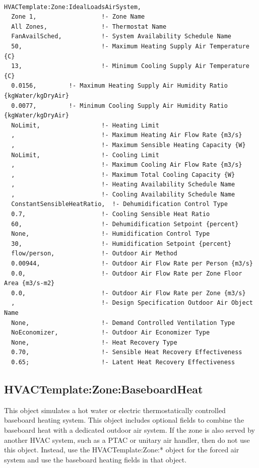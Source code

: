 \begin{lstlisting}

HVACTemplate:Zone:IdealLoadsAirSystem,
  Zone 1,                  !- Zone Name
  All Zones,               !- Thermostat Name
  FanAvailSched,           !- System Availability Schedule Name
  50,                      !- Maximum Heating Supply Air Temperature {C}
  13,                      !- Minimum Cooling Supply Air Temperature {C}
  0.0156,         !- Maximum Heating Supply Air Humidity Ratio {kgWater/kgDryAir}
  0.0077,         !- Minimum Cooling Supply Air Humidity Ratio {kgWater/kgDryAir}
  NoLimit,                 !- Heating Limit
  ,                        !- Maximum Heating Air Flow Rate {m3/s}
  ,                        !- Maximum Sensible Heating Capacity {W}
  NoLimit,                 !- Cooling Limit
  ,                        !- Maximum Cooling Air Flow Rate {m3/s}
  ,                        !- Maximum Total Cooling Capacity {W}
  ,                        !- Heating Availability Schedule Name
  ,                        !- Cooling Availability Schedule Name
  ConstantSensibleHeatRatio,  !- Dehumidification Control Type
  0.7,                     !- Cooling Sensible Heat Ratio
  60,                      !- Dehumidification Setpoint {percent}
  None,                    !- Humidification Control Type
  30,                      !- Humidification Setpoint {percent}
  flow/person,             !- Outdoor Air Method
  0.00944,                 !- Outdoor Air Flow Rate per Person {m3/s}
  0.0,                     !- Outdoor Air Flow Rate per Zone Floor Area {m3/s-m2}
  0.0,                     !- Outdoor Air Flow Rate per Zone {m3/s}
  ,                        !- Design Specification Outdoor Air Object Name
  None,                    !- Demand Controlled Ventilation Type
  NoEconomizer,            !- Outdoor Air Economizer Type
  None,                    !- Heat Recovery Type
  0.70,                    !- Sensible Heat Recovery Effectiveness
  0.65;                    !- Latent Heat Recovery Effectiveness
\end{lstlisting}

\subsection{HVACTemplate:Zone:BaseboardHeat}\label{hvactemplatezonebaseboardheat}

This object simulates a hot water or electric thermostatically controlled baseboard heating system. This object includes optional fields to combine the baseboard heat with a dedicated outdoor air system. If the zone is also served by another HVAC system, such as a PTAC or unitary air handler, then do not use this object. Instead, use the HVACTemplate:Zone:* object for the forced air system and use the baseboard heating fields in that object.

